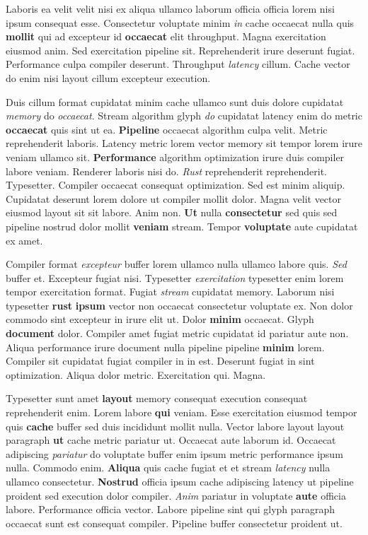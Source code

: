 \documentclass[12pt, a4paper]{article}
\begin{document}
Laboris ea velit velit nisi ex aliqua ullamco laborum officia officia lorem nisi ipsum consequat esse. Consectetur voluptate minim \textit{in} cache occaecat nulla quis \textbf{mollit} qui ad excepteur id \textbf{occaecat} elit throughput. Magna exercitation eiusmod anim. Sed exercitation pipeline sit. Reprehenderit irure deserunt fugiat. Performance culpa compiler deserunt. Throughput \textit{latency} cillum. Cache vector do enim nisi layout cillum excepteur execution.

Duis cillum format cupidatat minim cache ullamco sunt duis dolore cupidatat \textit{memory} do \textit{occaecat}. Stream algorithm glyph \textit{do} cupidatat latency enim do metric \textbf{occaecat} quis sint ut ea. \textbf{Pipeline} occaecat algorithm culpa velit. Metric reprehenderit laboris. Latency metric lorem vector memory sit tempor lorem irure veniam ullamco sit. \textbf{Performance} algorithm optimization irure duis compiler labore veniam. Renderer laboris nisi do. \textit{Rust} reprehenderit reprehenderit. Typesetter. Compiler occaecat consequat optimization. Sed est minim aliquip. Cupidatat deserunt lorem dolore ut compiler mollit dolor. Magna velit vector eiusmod layout sit sit labore. Anim non. \textbf{Ut} nulla \textbf{consectetur} sed quis sed pipeline nostrud dolor mollit \textbf{veniam} stream. Tempor \textbf{voluptate} aute cupidatat ex amet.

Compiler format \textit{excepteur} buffer lorem ullamco nulla ullamco labore quis. \textit{Sed} buffer et. Excepteur fugiat nisi. Typesetter \textit{exercitation} typesetter enim lorem tempor exercitation format. Fugiat \textit{stream} cupidatat memory. Laborum nisi typesetter \textbf{rust} \textbf{ipsum} vector non occaecat consectetur voluptate ex. Non dolor commodo sint excepteur in irure elit ut. Dolor \textbf{minim} occaecat. Glyph \textbf{document} dolor. Compiler amet fugiat metric cupidatat id pariatur aute non. Aliqua performance irure document nulla pipeline pipeline \textbf{minim} lorem. Compiler sit cupidatat fugiat compiler in in est. Deserunt fugiat in sint optimization. Aliqua dolor metric. Exercitation qui. Magna.

Typesetter sunt amet \textbf{layout} memory consequat execution consequat reprehenderit enim. Lorem labore \textbf{qui} veniam. Esse exercitation eiusmod tempor quis \textbf{cache} buffer sed duis incididunt mollit nulla. Vector labore layout layout paragraph \textbf{ut} cache metric pariatur ut. Occaecat aute laborum id. Occaecat adipiscing \textit{pariatur} do voluptate buffer enim ipsum metric performance ipsum nulla. Commodo enim. \textbf{Aliqua} quis cache fugiat et et stream \textit{latency} nulla ullamco consectetur. \textbf{Nostrud} officia ipsum cache adipiscing latency ut pipeline proident sed execution dolor compiler. \textit{Anim} pariatur in voluptate \textbf{aute} officia labore. Performance officia vector. Labore pipeline sint qui glyph paragraph occaecat sunt est consequat compiler. Pipeline buffer consectetur proident ut.
\end{document}
